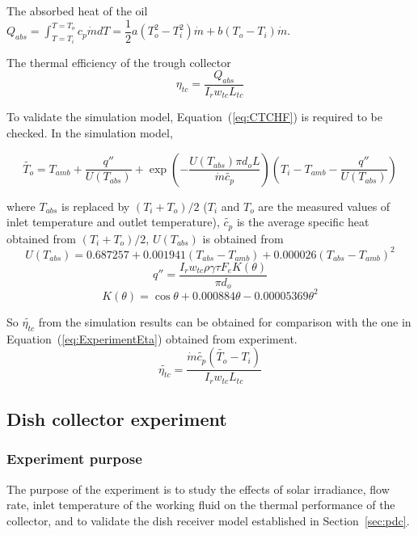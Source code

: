The absorbed heat of the oil $Q_{abs} = \int_{T=T_i}^{T = T_o}c_p\dot{m}dT = \dfrac{1}{2}a(T_o^2 - T_i^2)\dot{m} + b (T_o - T_i)\dot{m}$.

The thermal efficiency of the trough collector 
\begin{equation}
	\eta_{tc} = \dfrac{Q_{abs}}{I_rw_{tc}L_{tc}}
	\label{eq:ExperimentEta}
\end{equation}

To validate the simulation model, Equation~(\ref{eq:CTCHF}) is required to be checked. In the simulation model,

\begin{equation}
	\widetilde{T_{o}}=T_{amb} + \dfrac{q''}{U(T_{abs})} + \exp(-\frac{U(T_{abs})\pi d_o L}{\dot{m}\widetilde{c_p}})(T_{i}-T_{amb}-\dfrac{q''}{U(T_{abs})})
	\label{eq:CheckT_o}
\end{equation}

where $T_{abs}$ is replaced by $(T_i + T_o)/2$ ($T_i$ and $T_o$ are the measured values of inlet temperature and outlet temperature), $\widetilde{c_p}$ is the average specific heat obtained from $(T_i + T_o)/2$,
$U(T_{abs})$ is obtained from~\cite{Romero2007}
\begin{equation}
	U(T_{abs}) = 0.687257 + 0.001941(T_{abs} - T_{amb}) + 0.000026(T_{abs} - T_{amb})^2
\end{equation}
\begin{equation}
	q'' = \frac{I_r w_{tc} \rho \gamma \tau F_e K(\theta)}{\pi d_o}
\end{equation}
\begin{equation}
	K(\theta) = \cos\theta+0.000884\theta-0.00005369\theta^2
\end{equation}

So $\widetilde{\eta_{tc}}$ from the simulation results can be obtained for comparison with the one in Equation~(\ref{eq:ExperimentEta}) obtained from experiment.
\begin{equation}
	\widetilde{\eta_{tc}} = \dfrac{\dot{m}\widetilde{c_p}(\widetilde{T_o}-T_i)}{I_rw_{tc}L_{tc}}
\end{equation}
	
\subsection{Dish collector experiment}
\subsubsection{Experiment purpose}
The purpose of the experiment is to study the effects of solar irradiance, flow rate, inlet temperature of the working fluid on the thermal performance of the collector, and to validate the dish receiver model established in Section~\ref{sec:pdc}.

